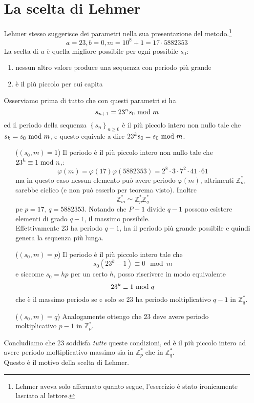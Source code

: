 \section{La scelta di Lehmer}

	Lehmer stesso suggerisce dei parametri nella sua presentazione del metodo.\footnote{Lehmer aveva solo affermato quanto segue, l'esercizio è stato ironicamente lasciato al lettore.}
	\begin{equation*}
	a=23, b=0, m=10^8+1=17\cdot5882353
	\end{equation*}
	La scelta di $a$ è quella migliore possibile per ogni possibile $s_0$:
	\begin{enumerate}
		\item nessun altro valore produce una sequenza con periodo più grande
		\item è il più piccolo per cui capita
	\end{enumerate}
	Osserviamo prima di tutto che con questi parametri si ha 
	\begin{equation*}
	s_{n+1}=23^ns_0\ \mathrm{mod}\ m
	\end{equation*}
	ed il periodo della sequenza $\left\{s_n\right\}_{n\geq0}$ è il più piccolo intero non nullo tale che $s_k=s_0\ \mathrm{mod}\ m$, e questo equivale a dire $23^ks_0=s_0\ \mathrm{mod}\ m$.
	\begin{itemize}
		\item[($(s_0,m)=1$)] Il periodo è il più piccolo intero non nullo tale che $23^k\equiv1\ \mathrm{mod}\ n$,:
		\begin{equation*}
		\varphi(m)=\varphi(17)\varphi(5882353)=2^8\cdot3\cdot7^2\cdot41\cdot61
		\end{equation*}
		ma in questo caso nessun elemento può avere periodo $\varphi(m)$, altrimenti $\mathbb{Z}_m^*$ sarebbe ciclico (e non può esserlo per teorema visto). Inoltre 
		\begin{equation*}
		\mathbb{Z}_m^*\simeq\mathbb{Z}_p^*\mathbb{Z}_q^*
		\end{equation*}
		pe $p=17$, $q=5882353$. Notando che $P-1$ divide $q-1$ possono esistere elementi di grado $q-1$, il massimo possibile. \\ Effettivamente 23 ha periodo $q-1$, ha il periodo più grande possibile e quindi genera la sequenza più lunga.
		\item[($(s_0,m)=p$)] Il periodo è il più piccolo intero tale che 
		\begin{equation*}
		s_0\left(23^k-1\right)\equiv0\mod m
		\end{equation*}
		e siccome $s_0=hp$ per un certo $h$, posso riscrivere in modo equivalente
		\begin{equation*}
		23^k\equiv1\ \mathrm{mod}\ q
		\end{equation*}
		che è il massimo periodo se e solo se 23 ha periodo moltiplicativo $q-1$ in $\mathbb{Z}_q^*$.
		\item[($(s_0,m)=q$)] Analogamente ottengo che 23 deve avere periodo moltiplicativo $p-1$ in $\mathbb{Z}_p^*$.
	\end{itemize}
	Concludiamo che 23 soddisfa \textit{tutte} queste condizioni, ed è il più piccolo intero ad avere periodo moltiplicativo massimo sia in $\mathbb{Z}_p^*$ che in $\mathbb{Z}_q^*$. \\ Questo è il motivo della scelta di Lehmer.
	
